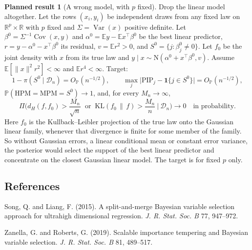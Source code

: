 \documentclass[11pt]{article}
\newcommand{\R}{\mathbb{R}}
\renewcommand{\P}{\mathbb{P}}
\newcommand{\E}{\mathbb{E}}
\newcommand{\N}{\mathrm{N}}
\newcommand{\norm}[1]{\lVert #1\rVert}
\newcommand{\ind}[1]{\mathbf{1}\{#1\}}
\newcommand{\Cov}{\operatorname{Cov}}
\newcommand{\Var}{\operatorname{Var}}
\newcommand{\PIP}{\mathrm{PIP}}
\newcommand{\HPM}{\mathrm{HPM}}
\newcommand{\MPM}{\mathrm{MPM}}
\newcommand{\OP}{O_{\P}}
\newcommand{\Dn}{\mathcal D_n}
\theoremstyle{plain}
\theoremstyle{definition}
\newtheorem{planned}{Planned result}
\begin{document}
\begin{planned}[A wrong model, with $p$ fixed]
Drop the linear model altogether. Let the rows $(x_i,y_i)$ be independent draws from any fixed law on
$\R^p\times\R$ with $p$ fixed and $\Sigma=\Var(x)$ positive definite. Let $\beta^0=\Sigma^{-1}\Cov(x,y)$ and
$\alpha^0=\E y-\E x^\top\beta^0$ be the best linear predictor, $r=y-\alpha^0-x^\top\beta^0$ its residual, $v=\E
r^2>0$, and $S^0=\{j:\beta^0_j\neq0\}$. Let $f_0$ be the joint density with $x$ from its true law and $y\mid
x\sim\N(\alpha^0+x^\top\beta^0,v)$. Assume $\E[\norm{x}^2r^2]<\infty$ and $\E r^4<\infty$. Target:
\[
  1-\pi(S^0\mid\Dn)=\OP(n^{-1/2}),\qquad \max_j\big|\PIP_j-\ind{j\in S^0}\big|=\OP(n^{-1/2}),
\]
$\P(\HPM=\MPM=S^0)\to1$, and, for every $M_n\to\infty$,
\[
  \Pi\Big(d_H(f,f_0)>\frac{M_n}{\sqrt n}\ \text{ or }\ \mathrm{KL}(f_0\,\|\,f)>\frac{M_n}{n}\ \Big|\ \Dn\Big)\to0\quad\text{in probability.}
\]
Here $f_0$ is the Kullback--Leibler projection of the true law onto the Gaussian linear family, whenever that
divergence is finite for some member of the family. So without Gaussian errors, a linear conditional mean or constant
error variance, the posterior would select the support of the best linear predictor and concentrate on the closest
Gaussian linear model. The target is for fixed $p$ only.
\end{planned}

\subsection*{References}
{\small
\noindent Song, Q. and Liang, F. (2015). A split-and-merge Bayesian variable selection approach for ultrahigh
dimensional regression. \emph{J. R. Stat. Soc. B} 77, 947--972.

\smallskip
\noindent Zanella, G. and Roberts, G. (2019). Scalable importance tempering and Bayesian variable selection.
\emph{J. R. Stat. Soc. B} 81, 489--517.}
\end{document}
